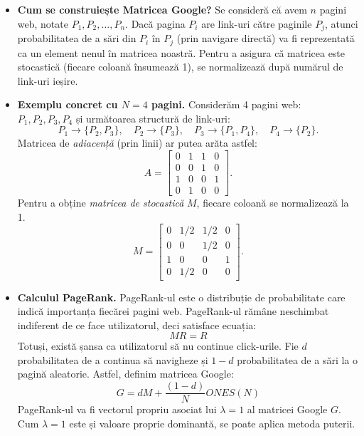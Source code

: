 \documentclass{exam}
\begin{document}
\begin{itemize}
	\item \textbf{Cum se construiește Matricea Google?} Se consideră că avem $n$
	      pagini web, notate $P_1, P_2, \ldots, P_n$. Dacă pagina $P_i$ are link-uri
	      către paginile $P_j$, atunci probabilitatea de a sări din $P_i$ în $P_j$
	      (prin navigare directă) va fi reprezentată ca un element nenul în matricea
	      noastră. Pentru a asigura că matricea este stocastică
	      (fiecare coloană însumează 1), se normalizează după numărul de link-uri
	      ieșire.

	\item \textbf{Exemplu concret cu $N=4$ pagini.} Considerăm 4 pagini web:
	      $P_1, P_2, P_3, P_4$ și următoarea structură de link-uri:
	      \begin{equation*}
		      P_1 \to \{P_2, P_3\}, \quad
		      P_2 \to \{P_3\}, \quad
		      P_3 \to \{P_1, P_4\}, \quad
		      P_4 \to \{P_2\}.
	      \end{equation*}
	      Matricea de \emph{adiacență} (prin linii) ar putea arăta astfel:
	      \begin{equation*}
		      A = \begin{bmatrix}
			      0 & 1 & 1 & 0 \\
			      0 & 0 & 1 & 0 \\
			      1 & 0 & 0 & 1 \\
			      0 & 1 & 0 & 0
		      \end{bmatrix}.
	      \end{equation*}
	      Pentru a obține \emph{matricea de stocastică} $M$, fiecare
	      coloană se normalizează la 1.
	      \begin{equation*}
		      M = \begin{bmatrix}
			      0 & 1/2 & 1/2 & 0 \\
			      0 & 0   & 1/2 & 0 \\
			      1 & 0   & 0   & 1 \\
			      0 & 1/2 & 0   & 0
		      \end{bmatrix}.
	      \end{equation*}

	\item \textbf{Calculul PageRank.} PageRank-ul este o distribuție de
	      probabilitate care indică importanța fiecărei pagini web. PageRank-ul
	      rămâne neschimbat indiferent de ce face utilizatorul, deci satisface
	      ecuația:
	      \begin{equation*}
		      M R = R
	      \end{equation*}
	      Totuși, există șansa ca utilizatorul să nu continue click-urile. Fie
	      $d$ probabilitatea de a continua să navigheze și $1-d$ probabilitatea
	      de a sări la o pagină aleatorie. Astfel, definim matricea Google:
	      \begin{equation*}
		      G = d M + \frac{(1-d)}{N} ONES(N)
	      \end{equation*}
	      PageRank-ul va fi vectorul propriu asociat lui $\lambda=1$ al matricei
	      Google $G$. Cum $\lambda=1$ este și valoare proprie dominantă, se
	      poate aplica metoda puterii.


\end{itemize}
\end{document}
